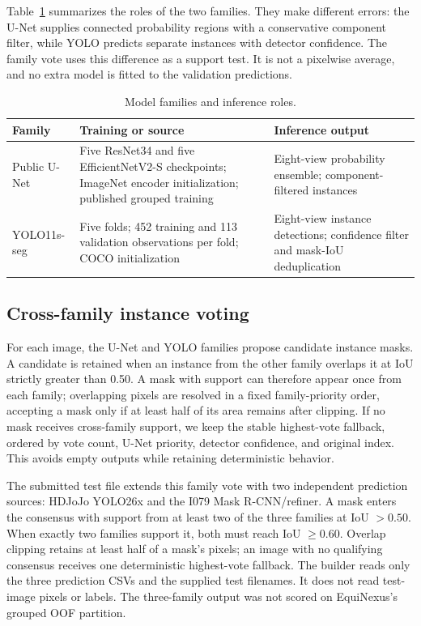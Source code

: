 \documentclass[sigconf]{acmart}
\begin{document}
Table~\ref{tab:families} summarizes the roles of the two families. They make different errors: the U-Net supplies connected probability regions with a conservative component filter, while YOLO predicts separate instances with detector confidence. The family vote uses this difference as a support test. It is not a pixelwise average, and no extra model is fitted to the validation predictions.

\begin{table}[t]
\centering
\caption{Model families and inference roles.}
\label{tab:families}
\small
\begin{tabularx}{\columnwidth}{lXX}
\toprule
Family & Training or source & Inference output \\
\midrule
Public U-Net & Five ResNet34 and five EfficientNetV2-S checkpoints; ImageNet encoder initialization; published grouped training & Eight-view probability ensemble; component-filtered instances \\
YOLO11s-seg & Five folds; 452 training and 113 validation observations per fold; COCO initialization & Eight-view instance detections; confidence filter and mask-IoU deduplication \\
\bottomrule
\end{tabularx}
\end{table}

\subsection{Cross-family instance voting}
For each image, the U-Net and YOLO families propose candidate instance masks. A candidate is retained when an instance from the other family overlaps it at IoU strictly greater than 0.50. A mask with support can therefore appear once from each family; overlapping pixels are resolved in a fixed family-priority order, accepting a mask only if at least half of its area remains after clipping. If no mask receives cross-family support, we keep the stable highest-vote fallback, ordered by vote count, U-Net priority, detector confidence, and original index. This avoids empty outputs while retaining deterministic behavior.

The submitted test file extends this family vote with two independent prediction sources: HDJoJo YOLO26x and the I079 Mask R-CNN/refiner. A mask enters the consensus with support from at least two of the three families at IoU $>0.50$. When exactly two families support it, both must reach IoU $\geq0.60$. Overlap clipping retains at least half of a mask's pixels; an image with no qualifying consensus receives one deterministic highest-vote fallback. The builder reads only the three prediction CSVs and the supplied test filenames. It does not read test-image pixels or labels. The three-family output was not scored on EquiNexus's grouped OOF partition.
\end{document}
